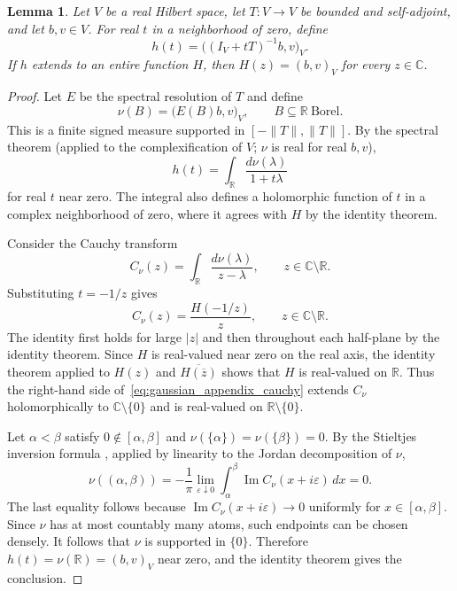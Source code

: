 \documentclass[11pt]{article}
\numberwithin{equation}{section}
\theoremstyle{plain}
\newtheorem{lemma}[theorem]{Lemma}
\theoremstyle{definition}
\theoremstyle{remark}
\begin{document}
\begin{lemma}
\label{lem:entire_selfadjoint_inverse}
Let $V$ be a real Hilbert space, let $T:V\to V$ be bounded and
self-adjoint, and let $b,v\in V$. For real $t$ in a neighborhood of
zero, define
\[
h(t)=\bigl((I_V+tT)^{-1}b,v\bigr)_V.
\]
If $h$ extends to an entire function $H$, then
$H(z)=(b,v)_V$ for every $z\in\mathbb C$.
\end{lemma}

\begin{proof}
Let $E$ be the spectral resolution of $T$ and define
\[
\nu(B)=\bigl(E(B)b,v\bigr)_V,
\qquad B\subseteq\mathbb R\ \text{Borel}.
\]
This is a finite signed measure supported in $[-\|T\|,\|T\|]$.
By the spectral theorem \cite[Section~3.1]{teschl2009mathematical} (applied to the complexification of $V$; $\nu$ is real for real $b,v$),
\[
h(t)=\int_{\mathbb R}\frac{d\nu(\lambda)}{1+t\lambda}
\]
for real $t$ near zero. The integral also defines a holomorphic
function of $t$ in a complex neighborhood of zero, where it agrees
with $H$ by the identity theorem.

Consider the Cauchy transform
\[
C_\nu(z)=\int_{\mathbb R}\frac{d\nu(\lambda)}{z-\lambda},
\qquad z\in\mathbb C\setminus\mathbb R.
\]
Substituting $t=-1/z$ gives
\begin{equation}\label{eq:gaussian_appendix_cauchy}
C_\nu(z)=\frac{H(-1/z)}{z},
\qquad z\in\mathbb C\setminus\mathbb R.
\end{equation}
The identity first holds for large $|z|$ and then throughout each
half-plane by the identity theorem. Since $H$ is real-valued near
zero on the real axis, the identity theorem applied to $H(z)$ and
$\overline{H(\overline z)}$ shows that $H$ is real-valued on
$\mathbb R$. Thus the right-hand side
of~\eqref{eq:gaussian_appendix_cauchy} extends $C_\nu$ holomorphically
to $\mathbb C\setminus\{0\}$ and is real-valued on
$\mathbb R\setminus\{0\}$.

Let $\alpha<\beta$ satisfy $0\notin[\alpha,\beta]$ and
$\nu(\{\alpha\})=\nu(\{\beta\})=0$.
By the Stieltjes inversion formula
\cite[Theorem~3.21]{teschl2009mathematical}, applied by linearity to
the Jordan decomposition of $\nu$,
\[
\nu((\alpha,\beta))
=-\frac{1}{\pi}\lim_{\varepsilon\downarrow0}
\int_\alpha^\beta\operatorname{Im}C_\nu(x+i\varepsilon)\,dx
=0.
\]
The last equality follows because
$\operatorname{Im}C_\nu(x+i\varepsilon)\to0$ uniformly for
$x\in[\alpha,\beta]$. Since $\nu$ has at most countably many atoms,
such endpoints can be chosen densely. It follows that $\nu$ is
supported in $\{0\}$. Therefore
$h(t)=\nu(\mathbb R)=(b,v)_V$ near zero, and the identity theorem
gives the conclusion.
\end{proof}
\end{document}
